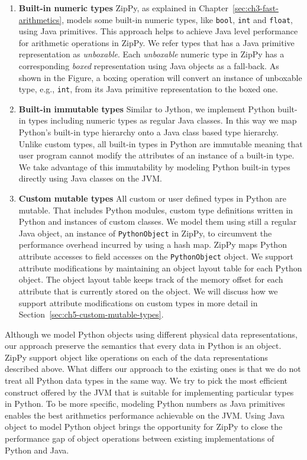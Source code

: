 \begin{enumerate}

\item \textbf{Built-in numeric types}
ZipPy, as explained in Chapter~\ref{sec:ch3-fast-arithmetics}, models some built-in numeric types, like \texttt{bool}, \texttt{int} and \texttt{float}, using Java primitives.
This approach helps to achieve Java level performance for arithmetic operations in ZipPy.
We refer types that has a Java primitive representation as \emph{unboxable}.
Each \emph{unboxable} numeric type in ZipPy has a corresponding \emph{boxed} representation using Java objects as a fall-back.
As shown in the Figure, a boxing operation will convert an instance of unboxable type, e.g., \texttt{int}, from its Java primitive representation to the boxed one.

\item \textbf{Built-in immutable types}
Similar to Jython, we implement Python built-in types including numeric types as regular Java classes.
In this way we map Python's built-in type hierarchy onto a Java class based type hierarchy.
Unlike custom types, all built-in types in Python are immutable meaning that user program cannot modify the attributes of an instance of a built-in type.
We take advantage of this immutability by modeling Python built-in types directly using Java classes on the JVM.

\item \textbf{Custom mutable types}
All custom or user defined types in Python are mutable.
That includes Python modules, custom type definitions written in Python and instances of custom classes.
We model them using still a regular Java object, an instance of \texttt{PythonObject} in ZipPy, to circumvent the performance overhead incurred by using a hash map.
ZipPy maps Python attribute accesses to field accesses on the \texttt{PythonObject} object.
We support attribute modifications by maintaining an object layout table for each Python object.
The object layout table keeps track of the memory offset for each attribute that is currently stored on the object.
We will discuss how we support attribute modifications on custom types in more detail in Section~\ref{sec:ch5-custom-mutable-types}.

\end{enumerate}

Although we model Python objects using different physical data representations, our approach preserve the semantics that every data in Python is an object.
ZipPy support object like operations on each of the data representations described above.
What differs our approach to the existing ones is that we do not treat all Python data types in the same way.
We try to pick the most efficient construct offered by the JVM that is suitable for implementing particular types in Python.
To be more specific, modeling Python numbers as Java primitives enables the best arithmetics performance achievable on the JVM.
Using Java object to model Python object brings the opportunity for ZipPy to close the performance gap of object operations between existing implementations of Python and Java.

